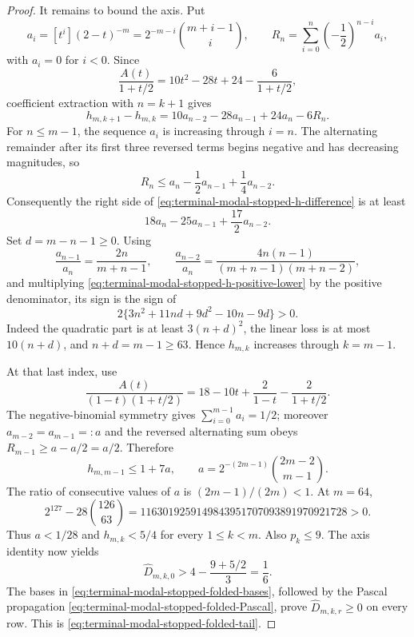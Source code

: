 \begin{proof}
It remains to bound the axis.  Put
\begin{equation}
 a_i=[t^i](2-t)^{-m}
 =2^{-m-i}\binom{m+i-1}{i},\qquad
 R_n=\sum_{i=0}^n\left(-\frac12\right)^{n-i}a_i,
 \label{eq:terminal-modal-stopped-h-aR}
\end{equation}
with $a_i=0$ for $i<0$.  Since
\begin{equation}
 \frac{A(t)}{1+t/2}
 =10t^2-28t+24-\frac6{1+t/2},
\end{equation}
coefficient extraction with $n=k+1$ gives
\begin{equation}
 h_{m,k+1}-h_{m,k}
 =10a_{n-2}-28a_{n-1}+24a_n-6R_n.
 \label{eq:terminal-modal-stopped-h-difference}
\end{equation}
For $n\le m-1$, the sequence $a_i$ is increasing through $i=n$.  The
alternating remainder after its first three reversed terms begins negative
and has decreasing magnitudes, so
\begin{equation}
 R_n\le a_n-\frac12a_{n-1}+\frac14a_{n-2}.
\end{equation}
Consequently the right side of
\eqref{eq:terminal-modal-stopped-h-difference} is at least
\begin{equation}
 18a_n-25a_{n-1}+\frac{17}{2}a_{n-2}.
 \label{eq:terminal-modal-stopped-h-positive-lower}
\end{equation}
Set $d=m-n-1\ge0$.  Using
\[
 \frac{a_{n-1}}{a_n}=\frac{2n}{m+n-1},\qquad
 \frac{a_{n-2}}{a_n}
 =\frac{4n(n-1)}{(m+n-1)(m+n-2)},
\]
and multiplying \eqref{eq:terminal-modal-stopped-h-positive-lower} by the
positive denominator, its sign is the sign of
\begin{equation}
 2\{3n^2+11nd+9d^2-10n-9d\}>0.
\end{equation}
Indeed the quadratic part is at least $3(n+d)^2$, the linear loss is at
most $10(n+d)$, and $n+d=m-1\ge63$.  Hence $h_{m,k}$ increases through
$k=m-1$.

At that last index, use
\begin{equation}
 \frac{A(t)}{(1-t)(1+t/2)}
 =18-10t+\frac2{1-t}-\frac2{1+t/2}.
\end{equation}
The negative-binomial symmetry gives
$\sum_{i=0}^{m-1}a_i=1/2$; moreover
$a_{m-2}=a_{m-1}=:a$ and the reversed alternating sum obeys
$R_{m-1}\ge a-a/2=a/2$.  Therefore
\begin{equation}
 h_{m,m-1}\le1+7a,\qquad
 a=2^{-(2m-1)}\binom{2m-2}{m-1}.
\end{equation}
The ratio of consecutive values of $a$ is $(2m-1)/(2m)<1$.  At $m=64$,
\begin{equation}
 2^{127}-28\binom{126}{63}
 =1163019259149843951707093891970921728>0.
\end{equation}
Thus $a<1/28$ and $h_{m,k}<5/4$ for every $1\le k<m$.  Also $p_k\le9$.
The axis identity now yields
\begin{equation}
 \widehat D_{m,k,0}
 >4-\frac{9+5/2}{3}=\frac16.
\end{equation}
The bases in \eqref{eq:terminal-modal-stopped-folded-bases}, followed by
the Pascal propagation \eqref{eq:terminal-modal-stopped-folded-Pascal},
prove $\widehat D_{m,k,r}\ge0$ on every row.  This is
\eqref{eq:terminal-modal-stopped-folded-tail}.
\end{proof}

